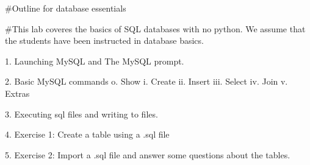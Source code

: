 #Outline for database essentials

#This lab coveres the basics of SQL databases with no python.  We assume that the students have been instructed in database basics.

1.  Launching MySQL and The MySQL prompt.

2.  Basic MySQL commands
	o.		Show
	i. 		Create
	ii. 	Insert
	iii.	Select
	iv.		Join
	v. 		Extras

3.  Executing sql files and writing to files.

4.  Exercise 1:  Create a table using a .sql file

5.  Exercise 2:  Import a .sql file and answer some questions about the tables.
